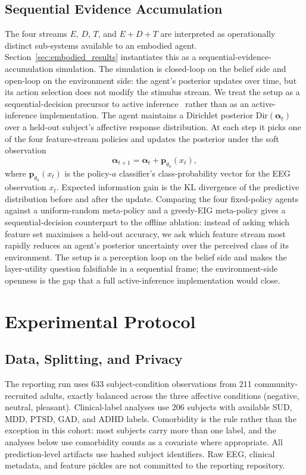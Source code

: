 \documentclass[journal]{IEEEtran}
\begin{document}
\subsection{Sequential Evidence Accumulation}
The four streams $E$, $D$, $T$, and $E+D+T$ are interpreted as operationally distinct sub-systems available to an embodied agent. Section~\ref{sec:embodied_results} instantiates this as a sequential-evidence-accumulation simulation. The simulation is closed-loop on the belief side and open-loop on the environment side: the agent's posterior updates over time, but its action selection does not modify the stimulus stream. We treat the setup as a sequential-decision precursor to active inference~\cite{friston2010free,parr2022activeinference,pezzulo2015active} rather than as an active-inference implementation. The agent maintains a Dirichlet posterior $\mathrm{Dir}(\boldsymbol{\alpha}_t)$ over a held-out subject's affective response distribution. At each step it picks one of the four feature-stream policies and updates the posterior under the soft observation
\begin{equation}
\boldsymbol{\alpha}_{t+1} = \boldsymbol{\alpha}_t + \mathbf{p}_{\theta_a}(x_t),
\label{eq:dirichlet_update}
\end{equation}
where $\mathbf{p}_{\theta_a}(x_t)$ is the policy-$a$ classifier's class-probability vector for the EEG observation $x_t$. Expected information gain is the KL divergence of the predictive distribution before and after the update. Comparing the four fixed-policy agents against a uniform-random meta-policy and a greedy-EIG meta-policy gives a sequential-decision counterpart to the offline ablation: instead of asking which feature set maximises a held-out accuracy, we ask which feature stream most rapidly reduces an agent's posterior uncertainty over the perceived class of its environment. The setup is a perception loop on the belief side and makes the layer-utility question falsifiable in a sequential frame; the environment-side openness is the gap that a full active-inference implementation would close.

\section{Experimental Protocol}
\subsection{Data, Splitting, and Privacy}
The reporting run uses 633 subject-condition observations from 211 community-recruited adults, exactly balanced across the three affective conditions (negative, neutral, pleasant). Clinical-label analyses use 206 subjects with available SUD, MDD, PTSD, GAD, and ADHD labels. Comorbidity is the rule rather than the exception in this cohort: most subjects carry more than one label, and the analyses below use comorbidity counts as a covariate where appropriate. All prediction-level artifacts use hashed subject identifiers. Raw EEG, clinical metadata, and feature pickles are not committed to the reporting repository.
\end{document}
